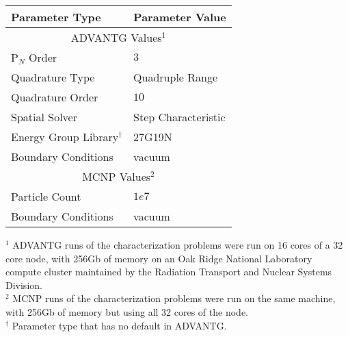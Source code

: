 \begin{tabular}{l|m{5cm}}
\toprule
Parameter Type & Parameter Value \\
\midrule \midrule
\multicolumn{2}{c}{ADVANTG Values$^1$} \\
\midrule
P$_N$ Order               &    $3$ \\
Quadrature Type           &  Quadruple Range \\
Quadrature Order          &    $10$ \\
Spatial Solver            &  Step Characteristic \\
Energy Group Library$^{\dagger}$     &    27G19N \\
Boundary Conditions & vacuum \\
\midrule \midrule
\multicolumn{2}{c}{MCNP Values$^2$} \\
\midrule
Particle Count      &   $1e7$ \\
Boundary Conditions & vacuum \\
\bottomrule
\end{tabular}
\begin{flushleft}
\footnotesize{
  $^1$ ADVANTG runs of the characterization problems
  were run on 16 cores of a 32 core node, with 256Gb of memory on
  an Oak Ridge National Laboratory compute cluster maintained by the Radiation
  Transport and Nuclear Systems Division. \\
  $^2$ MCNP runs of the characterization problems were run on the same
 machine, with 256Gb of memory but using all 32 cores of the node. \\
  $^{\dagger}$ Parameter type that has no default in ADVANTG.}
\end{flushleft}

